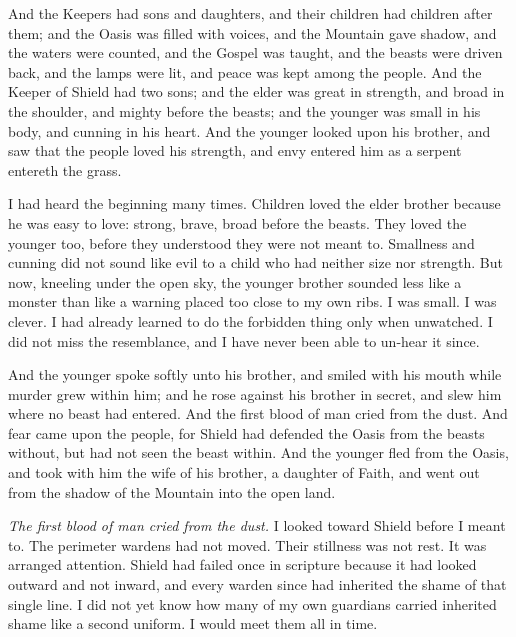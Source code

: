 \begin{scripture}
And the Keepers had sons and daughters, and their children had children after them; and the Oasis was filled with voices, and the Mountain gave shadow, and the waters were counted, and the Gospel was taught, and the beasts were driven back, and the lamps were lit, and peace was kept among the people.
And the Keeper of Shield had two sons; and the elder was great in strength, and broad in the shoulder, and mighty before the beasts; and the younger was small in his body, and cunning in his heart.
And the younger looked upon his brother, and saw that the people loved his strength, and envy entered him as a serpent entereth the grass.
\end{scripture}
I had heard the beginning many times. Children loved the elder brother because he was easy to love: strong, brave, broad before the beasts. They loved the younger too, before they understood they were not meant to. Smallness and cunning did not sound like evil to a child who had neither size nor strength. But now, kneeling under the open sky, the younger brother sounded less like a monster than like a warning placed too close to my own ribs. I was small. I was clever. I had already learned to do the forbidden thing only when unwatched. I did not miss the resemblance, and I have never been able to un-hear it since.\par

\begin{scripture}
And the younger spoke softly unto his brother, and smiled with his mouth while murder grew within him; and he rose against his brother in secret, and slew him where no beast had entered.
And the first blood of man cried from the dust.
And fear came upon the people, for Shield had defended the Oasis from the beasts without, but had not seen the beast within.
And the younger fled from the Oasis, and took with him the wife of his brother, a daughter of Faith, and went out from the shadow of the Mountain into the open land.
\end{scripture}
\textit{The first blood of man cried from the dust.} I looked toward Shield before I meant to. The perimeter wardens had not moved. Their stillness was not rest. It was arranged attention. Shield had failed once in scripture because it had looked outward and not inward, and every warden since had inherited the shame of that single line. I did not yet know how many of my own guardians carried inherited shame like a second uniform. I would meet them all in time.\par

